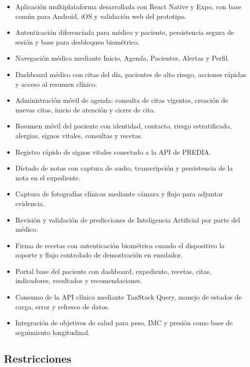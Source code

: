 \documentclass[12pt,letterpaper]{report}
\newcommand{\projectname}{PREDIA}
\begin{document}
\begin{itemize}
  \item Aplicación multiplataforma desarrollada con React Native y Expo, con base común para Android, iOS y validación web del prototipo.
  \item Autenticación diferenciada para médico y paciente, persistencia segura de sesión y base para desbloqueo biométrico.
  \item Navegación médica mediante Inicio, Agenda, Pacientes, Alertas y Perfil.
  \item Dashboard médico con citas del día, pacientes de alto riesgo, acciones rápidas y acceso al resumen clínico.
  \item Administración móvil de agenda: consulta de citas vigentes, creación de nuevas citas, inicio de atención y cierre de cita.
  \item Resumen móvil del paciente con identidad, contacto, riesgo estratificado, alergias, signos vitales, consultas y recetas.
  \item Registro rápido de signos vitales conectado a la API de \projectname.
  \item Dictado de notas con captura de audio, transcripción y persistencia de la nota en el expediente.
  \item Captura de fotografías clínicas mediante cámara y flujo para adjuntar evidencia.
  \item Revisión y validación de predicciones de Inteligencia Artificial por parte del médico.
  \item Firma de recetas con autenticación biométrica cuando el dispositivo la soporte y flujo controlado de demostración en emulador.
  \item Portal base del paciente con dashboard, expediente, recetas, citas, indicadores, resultados y recomendaciones.
  \item Consumo de la API clínica mediante TanStack Query, manejo de estados de carga, error y refresco de datos.
  \item Integración de objetivos de salud para peso, IMC y presión como base de seguimiento longitudinal.
\end{itemize}

\subsection{Restricciones}
\end{document}
